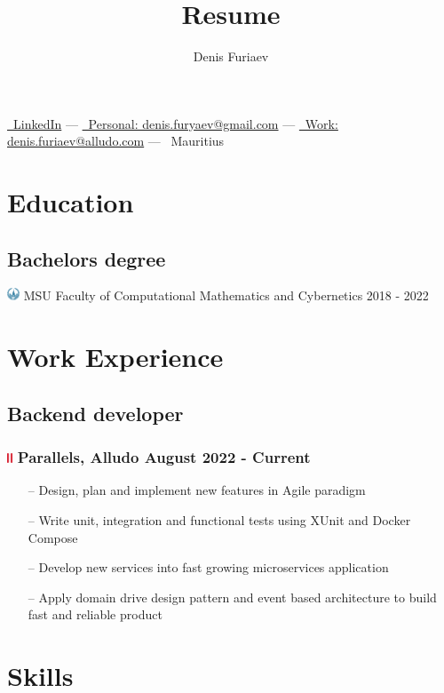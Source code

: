 \documentclass{article}
\makeatletter
\renewcommand{\maketitle}{
    \begin{center}

    { \Large \thetitle }
    
    \vspace{1em}
    
    { \huge\bfseries \theauthor }
    
    \vspace{.50em}

    \href{https://www.linkedin.com/in/denisfuryaev/}{\faLinkedinSquare \, LinkedIn} ---
    \href{mailto:denis.furyaev@gmail.com}{\faInbox \, Personal: denis.furyaev@gmail.com} --- 
    \href{mailto:denis.furiaev@alludo.com}{\faInbox \, Work: denis.furiaev@alludo.com} ---
    \faLocationArrow \, Mauritius 
    
    \end{center}
}
\makeatother
\begin{document}
\title{Resume}
\author{Denis Furiaev}

\maketitle

\section{Education}

\subsection{Bachelors degree}
\includegraphics[height=1em]{msu-logo.png} MSU Faculty of Computational Mathematics and Cybernetics \hfill 2018 - 2022

\section{Work Experience}

\subsection{Backend developer}
\subsubsection{\includegraphics[height=0.7em]{parallels-logo.png} Parallels,  Alludo \hfill August 2022 - Current}

\begin{itemize}
  \item[--] Design, plan and implement new features in Agile paradigm
  \item[--] Write unit, integration and functional tests using XUnit and Docker Compose
  \item[--] Develop new services into fast growing microservices application
  \item[--] Apply domain drive design pattern and event based architecture to build fast and reliable product
\end{itemize}

\section{Skills}
\end{document}
